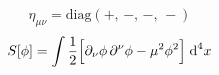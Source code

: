 \begin{equation}
	\eta_{\mu\nu}=\text{diag}\left(+,\,-,\,-,\,-\right)
\end{equation}
\begin{equation}
	S[\phi]=\int\frac{1}{2}\Big[\partial_\nu\phi\,\partial^\nu\phi-\mu^2\phi^2\Big]\;\text{d}^4 x
\end{equation}